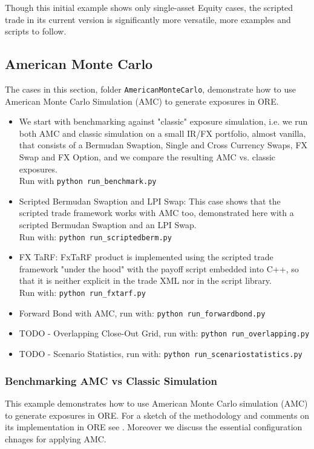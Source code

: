 Though this initial example shows only single-asset Equity cases, the scripted trade in its current version is
significantly more versatile, more examples and scripts to follow.

\subsection{American Monte Carlo}\label{example:amc}

The cases in this section, folder {\tt AmericanMonteCarlo},  demonstrate how to use American Monte Carlo Simulation (AMC)
to generate exposures in ORE.
\begin{itemize}
\item We start with benchmarking against "classic" exposure simulation, i.e. 
  we run both AMC and classic simulation on a small IR/FX portfolio, almost vanilla, that
  consists of a Bermudan Swaption, Single and Cross Currency Swaps, FX Swap and FX Option,
  and we compare the resulting AMC vs. classic exposures. \\
  Run with {\tt python run\_benchmark.py}
\item Scripted Bermudan Swaption and LPI Swap: This case shows that the scripted trade
  framework works with AMC too, demonstrated here with a scripted Bermudan Swaption and an LPI Swap. \\
  Run with: {\tt python run\_scriptedberm.py}
\item FX TaRF: FxTaRF product is implemented using the scripted trade framework "under the hood"
  with the payoff script embedded into C++, so that it is neither explicit in the trade XML nor
  in the script library.\\
  Run with: {\tt python run\_fxtarf.py}
\item Forward Bond with AMC, run with: {\tt python run\_forwardbond.py}
\item TODO - Overlapping Close-Out Grid, run with: {\tt python run\_overlapping.py}
\item TODO - Scenario Statistics, run with: {\tt python run\_scenariostatistics.py}
\end{itemize}

\subsubsection{Benchmarking AMC vs Classic Simulation}

This example demonstrates how to use American Monte Carlo simulation (AMC) to generate exposures in ORE.
For a sketch of the methodology and comments on its implementation in ORE see \cite{methods}.
Moreover we discuss the essential configuration chnages for applying AMC.

